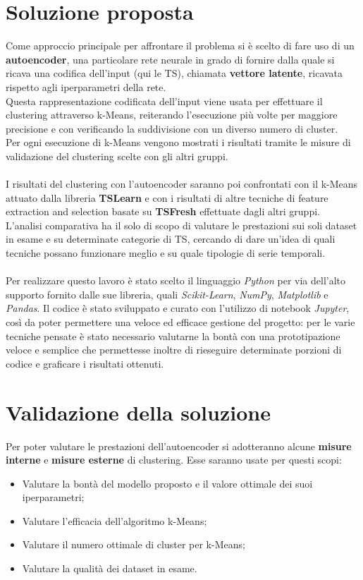 \section{Soluzione proposta}
Come approccio principale per affrontare il problema si è scelto di fare uso di un \textbf{autoencoder}, una particolare rete neurale in grado di fornire dalla quale si ricava una codifica dell'input (qui le TS), chiamata \textbf{vettore latente}, ricavata rispetto agli iperparametri della rete.\\
Questa rappresentazione codificata dell'input viene usata per effettuare il clustering attraverso k-Means, reiterando l'esecuzione più volte per maggiore precisione e con verificando la suddivisione con un diverso numero di cluster.\\
Per ogni esecuzione di k-Means vengono mostrati i risultati tramite le misure di validazione del clustering scelte con gli altri gruppi.\\
\\
I risultati del clustering con l'autoencoder saranno poi confrontati con il k-Means attuato dalla libreria \textbf{TSLearn} e con i risultati di altre tecniche di feature extraction and selection basate su \textbf{TSFresh} effettuate dagli altri gruppi.\\
L'analisi comparativa ha il solo di scopo di valutare le prestazioni sui soli dataset in esame e su determinate categorie di TS, cercando di dare un'idea di quali tecniche possano funzionare meglio e su quale tipologie di serie temporali.\\
\\
Per realizzare questo lavoro è stato scelto il linguaggio \textit{Python} per via dell'alto supporto fornito dalle sue libreria, quali \textit{Scikit-Learn}\cite{sklearn_api}, \textit{NumPy}\cite{numpy}, \textit{Matplotlib}\cite{matplotlib} e \textit{Pandas}\cite{pandas}. Il codice è stato sviluppato e curato con l'utilizzo di notebook \textit{Jupyter}, così da poter permettere una veloce ed efficace gestione del progetto: per le varie tecniche pensate è stato necessario valutarne la bontà con una prototipazione veloce e semplice che permettesse inoltre di rieseguire determinate porzioni di codice e graficare i risultati ottenuti.\\

\section{Validazione della soluzione}
Per poter valutare le prestazioni dell'autoencoder si adotteranno alcune \textbf{misure interne} e \textbf{misure esterne}\cite{metrics} di clustering. Esse saranno usate per questi scopi:
\begin{itemize}
	\item Valutare la bontà del modello proposto e il valore ottimale dei suoi iperparametri;
	\item Valutare l'efficacia dell'algoritmo k-Means;
	\item Valutare il numero ottimale di cluster per k-Means;
	\item Valutare la qualità dei dataset in esame.
\end{itemize}

